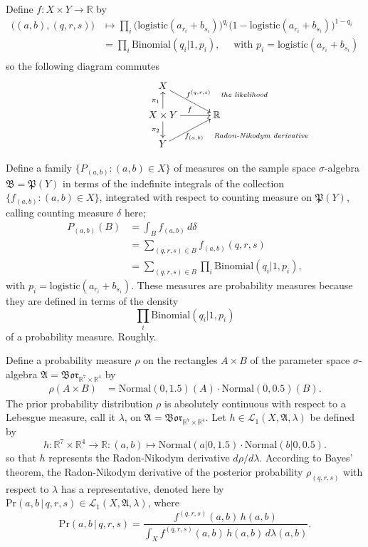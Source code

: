 \documentclass[
twoside=true,
paper=letter,
fontsize=9pt,
pagesize=auto,
leqno,
openany,
headsepline,
overfullrule,
]{scrbook}
\theoremstyle{plain}
\theoremstyle{plain}
\theoremstyle{definition}
\theoremstyle{bfnoteitalic}
\theoremstyle{bfnoteroman}
\newcommand{\sigalg}[1]{\mathfrak{#1}}
\newcommand{\cali}[1]{\mathscr{#1}}
\newcommand{\borel}{\mathfrak{Bor}}
\newcommand{\textsigma}{\hbox{\large{$\sigma$}}\kern-1pt}
\newcommand{\R}{\mathbb{R}}
\newcommand{\powerset}{\mathfrak{P}}
\newcommand{\function}{f}
\newcommand{\functioniii}{h}
\newcommand{\measurespace}{X}
\newcommand{\measurespaceii}{Y}
\newcommand{\seti}{A}
\newcommand{\setii}{B}
\newcommand{\projectionone}{\pi_1}
\newcommand{\projectiontwo}{\pi_2}
\newcommand{\pspace}{\measurespace}%
\newcommand{\sspace}{\measurespaceii}%
\newcommand{\sspacesig}{\sigalg{B}}
\newcommand{\pspacesig}{\sigalg{A}}
\begin{document}
Define $\function:\pspace\times\sspace \to \R$ by 
\begin{align*}
\bigl((a,b),(q,r,s)\bigr)
& \mapsto
\prod_i
\bigl( \text{logistic}(a_{r_i} + b_{s_i}) \bigr)^{q_i}
\bigl( 1 - \text{logistic}(a_{r_i} + b_{s_i}) \bigr)^{1-q_i} \\
& = \prod_i
\text{Binomial}(q_i \vert 1, p_i),\quad \text{ with $p_i = \text{logistic}(a_{r_i} + b_{s_i})$} \\
\end{align*}
so the following diagram commutes
\[
\xymatrix@R=16pt@C=30pt{ 
\pspace \ar[dr]^{\ \function^{(q,r,s)}\quad \rlap{\emph{\scriptsize the likelihood}}}
& \\
\pspace\times\sspace 
\ar[u]^{\projectionone}
\ar[d]_{\projectiontwo}
\ar[r]^{\function}
& \R \\
\sspace 
\ar[ur]_{\function_{(a,b)} \quad \rlap{\emph{\scriptsize Radon-Nikodym derivative}}} 
& 
}
\]

Define a family $\{P_{(a,b)}:(a,b)\in\pspace\}$ of measures on the sample space \textsigma-algebra
$\sspacesig=\powerset(\sspace)$ in terms of the indefinite integrals of the collection
$\{ \function_{(a,b)} : (a,b)\in\pspace \}$, integrated with respect to counting measure on 
$\powerset(\sspace)$, calling counting measure $\delta$ here;
\begin{align*}
P_{(a,b)}(\setii)
& = \int_\setii \function_{(a,b)} \,d\delta \\
& = \sum_{(q,r,s)\in\setii} \function_{(a,b)}(q,r,s) \\
& = \sum_{(q,r,s)\in\setii} \prod_i \text{Binomial}(q_i\vert 1,p_i),
\end{align*}
with $p_i=\text{logistic}(a_{r_i} + b_{s_i})$.
These measures are probability measures because they are defined in terms of the density 
\[
\prod_i \text{Binomial}(q_i\vert 1,p_i)
\]
of a probability measure. Roughly.

Define a probability measure $\rho$ on the rectangles 
$\seti\times\setii$ of the parameter space \textsigma-algebra 
$\pspacesig=\borel_{\R^7\times\R^4}$ by
\begin{align*}
\rho(\seti\times\setii)
&=
\text{Normal}(0,1.5)(\seti)\cdot
\text{Normal}(0,0.5)(\setii).
\end{align*}
The prior probability distribution $\rho$ is absolutely continuous with respect to a Lebesgue measure, call it
$\lambda$, on $\pspacesig=\borel_{\R^7\times\R^4}$.
Let $\functioniii\in\cali{L}_1(\pspace,\pspacesig,\lambda)$ be defined by
\[
\functioniii:\R^7\times\R^4\to\R:(a,b)\mapsto
\text{Normal}(a\vert 0,1.5)\cdot
\text{Normal}(b\vert 0,0.5).
\]
so that $\functioniii$ represents the Radon-Nikodym derivative $d\rho/d\lambda$.
According to Bayes' theorem, the Radon-Nikodym derivative of the posterior probability 
$\rho_{(q,r,s)}$ with respect to $\lambda$ has a representative, denoted here by 
$\text{Pr}(a,b\,\vert\, q,r,s)\in\cali{L}_1(\pspace, \pspacesig,\lambda)$,
where
\[
\text{Pr}(a,b\,\vert\, q,r,s)
=
\frac{\function^{(q,r,s)}(a,b)\,\functioniii(a,b)}
{\int_{\pspace}\function^{(q,r,s)}(a,b)\,\functioniii(a,b)\,d\lambda(a,b)}.
\]
\end{document}
